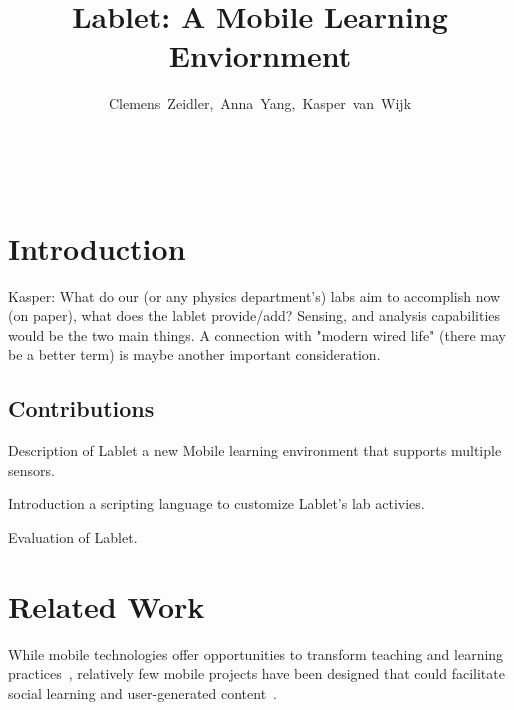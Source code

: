 \documentclass{sigchi}
\begin{document}
\title{Lablet: A Mobile Learning Enviornment}


\author{
	\alignauthor \mbox{Clemens Zeidler, Anna Yang, Kasper van Wijk}\\
		\\
		\\
		\\
}

\maketitle


\begin{abstract}
\end{abstract}





\section{Introduction}
Kasper: What do our (or any physics department's) labs aim to accomplish now (on paper), what does the lablet provide/add? Sensing, and analysis capabilities would be the two main things. A connection with "modern wired life" (there may be  a better term) is maybe another important consideration.

\subsection{Contributions}

\begin{itemize*}
\item Description of Lablet a new Mobile learning environment that supports multiple sensors.
\item Introduction a scripting language to customize Lablet's lab activies.
\item Evaluation of Lablet.
\end{itemize*}


\section{Related Work}
While mobile technologies offer opportunities to transform teaching and learning practices~\cite{karnad2014trends, Kukulska2010}, relatively few mobile projects have been designed that could facilitate social learning and user-generated content~\cite{Frohberg2009}.
\end{document}
